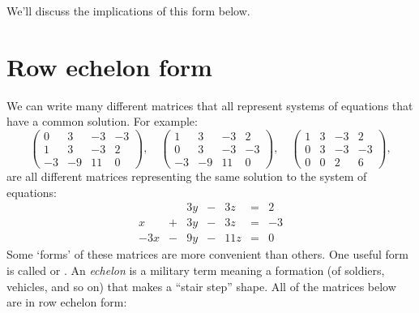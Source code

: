 \documentclass{ximera}
\begin{document}
We'll discuss the implications of this form below.


\section{Row echelon form}

We can write many different matrices that all represent systems
of equations that have a common solution. For example:
\[
\begin{pmatrix}
 0 &   3 & -3 & -3 \\
  1 &   3 & -3 & 2  \\
  -3& -9  & 11 & 0
\end{pmatrix},
\quad
\begin{pmatrix}
  1 &   3 & -3 & 2  \\
  0 &   3 & -3 & -3 \\
  -3& -9  & 11 & 0
\end{pmatrix},
\quad
\begin{pmatrix}
  1 &   3 & -3 & 2  \\
  0 &   3 & -3 & -3 \\
  0& 0  & 2 & 6
\end{pmatrix},
\]
are all different matrices representing the same solution to the
system of equations:
\[
\begin{array}{ccccccc}
       & & 3y &-& 3z &=& 2 \\
     x& +&3y&-&3z&=&-3\\
     -3x& -&9y&-&11z&=&0
\end{array}
\]
Some `forms' of these matrices are more convenient than others. One
useful form is called  or . An \textit{echelon} is a military term meaning a formation
(of soldiers, vehicles, and so on) that makes a ``stair step''
shape. All of the matrices below are in row echelon form:
\end{document}
